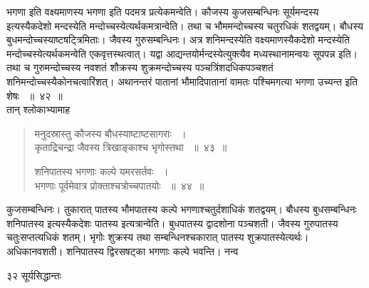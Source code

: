 \documentclass[11pt, openany]{book}
\begin{document}
\begin{sloppypar}
\noindent भगणा इति वक्ष्यमाणस्य भगणा इति पदमत्र प्रत्येकमन्वेति। कौजस्य कुजसम्बन्धिनः सूर्यमन्दस्य इत्यस्यैकदेशो मन्दस्येति मन्दोच्चस्येत्यर्थकमत्रान्वेति। तथा च भौममन्दोच्चस्य चतुरधिकं शतद्वयम्। बौधस्य बुधमन्दोच्चस्याष्टषट्त्रिमिताः। जैवस्य गुरुसम्बन्धिनः। अत्र शनिमन्दस्येति वक्ष्यमाणस्यैकदेशो मन्दस्येति मन्दोच्चस्येत्यर्थकमन्वेति एकवृत्तस्थत्वात्। यद्वा आद्यन्तयोर्मन्दस्येत्युक्त्यैव मध्यस्थानामन्वयः सूपपन्न इति। तथा च गुरुमन्दोच्चस्य नवशतं शौक्रस्य शुक्रमन्दोच्चस्य पञ्चत्रिंशदधिकपञ्चशतं शनिमन्दोच्चस्यैकोनचत्वारिंशत्। अथानन्तरं पातानां भौमादिपातानां वामतः पश्चिमगत्या भगणा उच्यन्त इति शेषः ~॥~४२~॥\\ 
\noindent तान् श्लोकाभ्यामाह\textendash
\end{sloppypar}
\begin{quote}
 
  {\ssi मनुदस्रास्तु कौजस्य बौधस्याष्टाष्टसागराः ~।\\
कृताद्रिचन्द्रा जैवस्य त्रिखाङ्काश्च भृगोस्तथा ~॥~४३~॥

शनिपातस्य भगणाः कल्पे यमरसर्तवः ~।\\
भगणाः पूर्वमेवात्र प्रोक्ताश्चत्रोच्चपातयोः ~॥~४४~॥}
\end{quote}
\begin{sloppypar}

कुजसम्बन्धिनः। तुकारात् पातस्य भौमपातस्य कल्पे भगणाश्चतुर्दशाधिकं शतद्वयम्। बौधस्य बुधसम्बन्धिनः शनिपातस्य इत्यस्यैकदेशः पातस्य इत्यत्रान्वेति। बुधपातस्य द्वादशोना पञ्चशती। जैवस्य गुरुपातस्य चतुःसप्तत्यधिकं शतम्। भृगोः शुक्रस्य तथा सम्बन्धिनश्चकारात् पातस्य शुक्रपातस्येत्यर्थः। अधिकानवशती। शनिपातस्य द्विरसषट्का भगणाः कल्पे भवन्ति। नन्व
\end{sloppypar}

\newpage

\noindent ३२ \hspace{4cm} सूर्यसिद्धान्तः 
\vspace{1cm}
\end{document}
